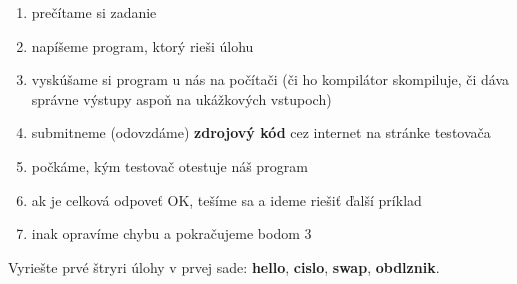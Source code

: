 \begin{enumerate}
    \vspace{-8pt}
    \item prečítame si zadanie
    \vspace{-5pt}
    \item napíšeme program, ktorý rieši úlohu
    \vspace{-5pt}
    \item vyskúšame si program u nás na počítači (či ho kompilátor
    skompiluje, či dáva správne výstupy aspoň na ukážkových vstupoch)
    \vspace{-5pt}
    \item submitneme (odovzdáme) \textbf{zdrojový kód} cez internet na stránke testovača
    \vspace{-5pt}
    \item počkáme, kým testovač otestuje náš program
    \vspace{-5pt}
    \item ak je celková odpoveť OK, tešíme sa a ideme riešiť ďalší príklad
    \vspace{-5pt}
    \item inak opravíme chybu a pokračujeme bodom 3
\end{enumerate}

\medskip

Vyriešte prvé štryri úlohy v prvej sade: \textbf{hello}, \textbf{cislo}, 
\textbf{swap}, \textbf{obdlznik}.




